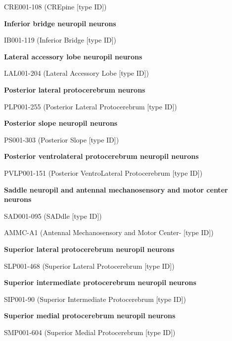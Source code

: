 \documentclass{article}
\begin{document}
{\footnotesize
\noindent\hspace*{1.0em}CRE001-108 (CREpine [type ID])\par
\noindent\textbf{Inferior bridge neuropil neurons}\par
\noindent\hspace*{1.0em}IB001-119 (Inferior Bridge [type ID])\par
\noindent\textbf{Lateral accessory lobe neuropil neurons}\par
\noindent\hspace*{1.0em}LAL001-204 (Lateral Accessory Lobe [type ID])\par
\noindent\textbf{Posterior lateral protocerebrum neurons}\par
\noindent\hspace*{1.0em}PLP001-255 (Posterior Lateral Protocerebrum [type ID])\par
\noindent\textbf{Posterior slope neuropil neurons}\par
\noindent\hspace*{1.0em}PS001-303 (Posterior Slope [type ID])\par
\noindent\textbf{Posterior ventrolateral protocerebrum neuropil neurons}\par
\noindent\hspace*{1.0em}PVLP001-151 (Posterior VentroLateral Protocerebrum [type ID])\par
\noindent\textbf{Saddle neuropil and antennal mechanosensory and motor center neurons}\par
\noindent\hspace*{1.0em}SAD001-095 (SADdle [type ID])\par
\noindent\hspace*{1.0em}AMMC-A1 (Antennal Mechanosensory and Motor Center- [type ID])\par
\noindent\textbf{Superior lateral protocerebrum neuropil neurons}\par
\noindent\hspace*{1.0em}SLP001-468 (Superior Lateral Protocerebrum [type ID])\par
\noindent\textbf{Superior intermediate protocerebrum neuropil neurons}\par
\noindent\hspace*{1.0em}SIP001-90 (Superior Intermediate Protocerebrum [type ID])\par
\noindent\textbf{Superior medial protocerebrum neuropil neurons}\par
\noindent\hspace*{1.0em}SMP001-604 (Superior Medial Protocerebrum [type ID])\par
}
\end{document}
